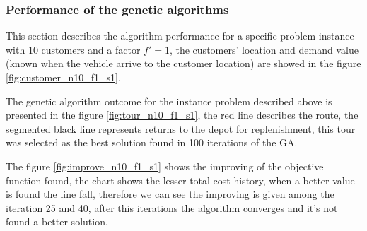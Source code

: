 \subsubsection*{Performance of the genetic algorithms}

This section describes the algorithm performance for a specific problem instance with 10 customers and a factor $f'=1$, the customers' location and demand value (known when the vehicle arrive to the customer location) are showed in the figure \ref{fig:customer_n10_f1_s1}.



The genetic algorithm outcome for the instance problem described above is presented in the figure \ref{fig:tour_n10_f1_s1}, the red line describes the route, the segmented black line represents returns to the depot for replenishment, this tour was selected as the best solution found in 100 iterations of the GA.


The figure \ref{fig:improve_n10_f1_s1} shows the improving of the objective function found, the chart shows the lesser total cost history, when a better value is found the line fall, therefore we can see the improving is given among the iteration 25 and 40, after this iterations the algorithm converges and it's not found a better solution.



